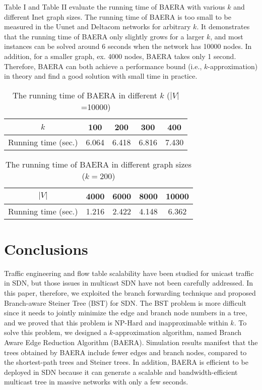 \documentclass[conference]{IEEEtran}
\begin{document}
Table I and Table II evaluate the running time of BAERA with various $k$ and
different Inet graph sizes. The running time of BAERA is too small to be
measured in the Uunet and Deltacom networks for arbitrary $k$. It
demonstrates that the running time of BAERA only slightly grows for a larger $k$, and most instances can be solved around 6 seconds when the network has
10000 nodes. In addition, for a smaller graph, ex. 4000 nodes, BAERA takes
only 1 second. Therefore, BAERA can both achieve a performance bound
(i.e., $k$-approximation) in theory and find a good solution with small time
in practice.

\begin{table}[t]
\caption{The running time of BAERA in different $k$ ($|V|$=10000)}\centering
\label{table:time_k}
\begin{tabular}{|c|c|c|c|c|}
\hline
$k$ & 100 & 200 & 300 & 400 \\ \hline
Running time (sec.) & 6.064 & 6.418 & 6.816 & 7.430 \\ \hline
\end{tabular}\end{table}

\begin{table}[t]
\caption{The running time of BAERA in different graph sizes ($k=200$)}\centering
\label{table:time_v}
\begin{tabular}{|c|c|c|c|c|}
\hline
$|V|$ & 4000 & 6000 & 8000 & 10000 \\ \hline
Running time (sec.) & 1.216 & 2.422 & 4.148 & 6.362 \\ \hline
\end{tabular}\end{table}

\section{Conclusions}
Traffic engineering and flow table scalability have been studied for unicast
traffic in SDN, but those issues in multicast SDN have not been carefully
addressed. In this paper, therefore, we exploited the branch forwarding
technique and proposed Branch-aware Steiner Tree (BST) for SDN. The BST
problem is more difficult since it needs to jointly minimize the edge and
branch node numbers in a tree, and we proved that this problem is NP-Hard
and inapproximable within $k$. To solve this problem, we designed a $k$-approximation algorithm, named Branch Aware Edge Reduction Algorithm
(BAERA). Simulation results manifest that the trees obtained by BAERA
include fewer edges and branch nodes, compared to the shortest-path trees
and Steiner trees. In addition, BAERA is efficient to be deployed in SDN because it can
generate a scalable and bandwidth-efficient multicast tree in massive
networks with only a few seconds.

\linespread{0.98}


\end{document}
